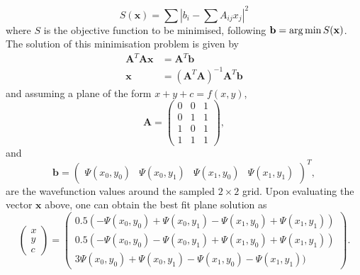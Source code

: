  \begin{equation}
 S(\mathbf{x}) = \displaystyle\sum |b_i - \displaystyle\sum A_{ij} x_j |^2
 \end{equation}
 where $S$ is the objective function to be minimised, following $\mathbf{b} = \operatorname*{arg\,min} S(\mathbf{x})$. The solution of this minimisation problem is given by
 \begin{subequations}
\begin{align}
    \mathbf{A} ^{T}\mathbf{A} \mathbf{x} &= \mathbf{A} ^{T}\mathbf{b} \\
    \mathbf{x} &= (\mathbf{A}^{T}\mathbf{A})^{-1}\mathbf{A}^{T}\mathbf{b}
\end{align}
\end{subequations}
and assuming a plane of the form $x + y + c = f(x,y)$,
\begin{equation}
    \mathbf{A} = \left(
    \begin{array}{ccc}
        0 & 0 & 1 \\
        0 & 1 & 1 \\
        1 & 0 & 1 \\
        1 & 1 & 1
    \end{array}\right),
\end{equation}
and
\begin{equation}
    \mathbf{b} = \left(
    \begin{array}{cccc}
        \Psi(x_0,y_0) & \Psi(x_0,y_1) & \Psi(x_1,y_0) & \Psi(x_1,y_1)
    \end{array} \right)^{T},
\end{equation}
are the wavefunction values around the sampled $2\times 2$ grid.
Upon evaluating the vector $\mathbf{x}$ above, one can obtain the best fit plane  solution as
\begin{equation}\left(
    \begin{array}{c}
        x \\
        y \\
        c
    \end{array}\right)
    = \left(
    \begin{array}{c}
        0.5( -\Psi(x_0,y_0) + \Psi(x_0,y_1) - \Psi(x_1,y_0) + \Psi(x_1,y_1) ) \\
        0.5( -\Psi(x_0,y_0) - \Psi(x_0,y_1) + \Psi(x_1,y_0) + \Psi(x_1,y_1) ) \\
        3\Psi(x_0,y_0) + \Psi(x_0,y_1) - \Psi(x_1,y_0) - \Psi(x_1,y_1) )
    \end{array}\right).
\end{equation}

